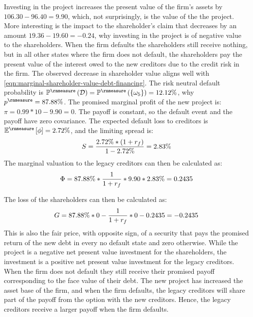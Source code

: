 \documentclass[main.tex]{subfiles}
\begin{document}
        Investing in the project increases the present value of the firm's assets by $106.30 - 96.40 = 9.90$, which, not surprisingly, is the value of the the project.
        More interesting is the impact to the shareholder's claim that decreases by an amount $19.36 - 19.60 = -0.24$, why investing in the project is of negative value to the shareholders.
        When the firm defaults the shareholders still receive nothing, but in all other states where the firm does not default, the shareholders pay the present value of the interest owed to the new creditors due to the credit risk in the firm.
        The observed decrease in shareholder value aligns well with 
        \cref{eqn:marginal-shareholder-value-debt-financing}. 
        The risk neutral default probability is 
        $\mathbb{P}^{\rnmeasure}\left(\mathcal{D}\right) 
            = \mathbb{P}^{\rnmeasure}\left(\{\omega_{5}\}\right) 
            = 12.12\%$,
        why $p^{\rnmeasure} = 87.88\%$.
        The promised marginal profit of the new project is:
        $\pi = 0.99 * 10 - 9.90 = 0$.
        The payoff is constant, so the default event and the payoff have zero covariance. 
        The expected default loss to creditors is 
        $\mathbb{E}^{\rnmeasure}\left[\phi\right] = 2.72\%$,
        and the limiting spread is:
        \begin{equation}
            S 
            = \frac{
                2.72\% * (1 + r_{f})
            }{
                1 - 2.72\%
            } 
            = 2.83\%
        \end{equation}
        The marginal valuation to the legacy creditors can then be calculated as:
        \begin{equation}
            \Phi 
            = 87.88\% * \frac{1}{1+r_{f}}  * 9.90 * 2.83\% 
            = 0.2435
        \end{equation}

        The loss of the shareholders can then be calculated as: 
            \begin{align}
                G = 87.88\%*0 - \frac{1}{1+r_{f}} * 0 - 0.2435 = -0.2435
            \end{align}
        This is also the fair price, with opposite sign, 
        of a security that pays the promised return of the new debt in every no default state and zero otherwise. 
        While the project is a negative net present value investment for the shareholders,
        the investment is a positive net present value investment for the legacy creditors.
        When the firm does not default they still receive their promised payoff corresponding to the face value of their debt.
        The new project has increased the asset base of the firm, and when the firm defaults, 
        the legacy creditors will share part of the payoff from the option with the new creditors.
        Hence, the legacy creditors receive a larger payoff when the firm defaults. 
\end{document}
